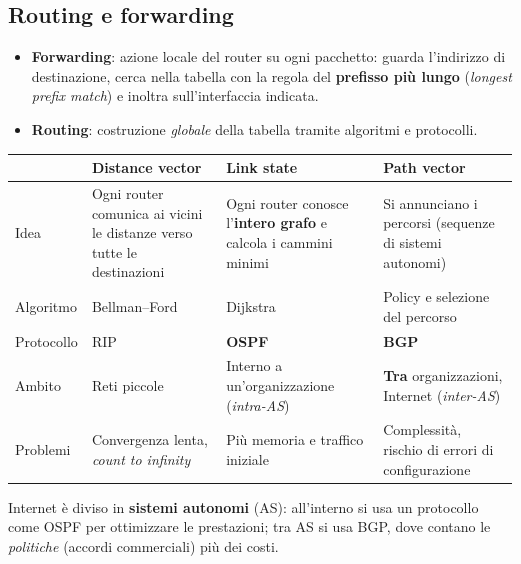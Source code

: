 \subsection{Routing e forwarding}
\begin{itemize}
    \item \textbf{Forwarding}: azione locale del router su ogni pacchetto: guarda l'indirizzo di destinazione, cerca nella tabella con la regola del \textbf{prefisso più lungo} (\emph{longest prefix match}) e inoltra sull'interfaccia indicata.
    \item \textbf{Routing}: costruzione \emph{globale} della tabella tramite algoritmi e protocolli.
\end{itemize}
\begin{center}
\small
\begin{tabularx}{\textwidth}{@{}>{\raggedright\arraybackslash}p{3.1cm}XXX@{}}
\toprule
 & \textbf{Distance vector} & \textbf{Link state} & \textbf{Path vector} \\
\midrule
Idea & Ogni router comunica ai vicini le distanze verso tutte le destinazioni & Ogni router conosce l'\textbf{intero grafo} e calcola i cammini minimi & Si annunciano i percorsi (sequenze di sistemi autonomi) \\
Algoritmo & Bellman--Ford & Dijkstra & Policy e selezione del percorso \\
Protocollo & RIP & \textbf{OSPF} & \textbf{BGP} \\
Ambito & Reti piccole & Interno a un'organizzazione (\emph{intra-AS}) & \textbf{Tra} organizzazioni, Internet (\emph{inter-AS}) \\
Problemi & Convergenza lenta, \emph{count to infinity} & Più memoria e traffico iniziale & Complessità, rischio di errori di configurazione \\
\bottomrule
\end{tabularx}
\end{center}
Internet è diviso in \textbf{sistemi autonomi} (AS): all'interno si usa un protocollo come OSPF per ottimizzare le prestazioni; tra AS si usa BGP, dove contano le \emph{politiche} (accordi commerciali) più dei costi.

